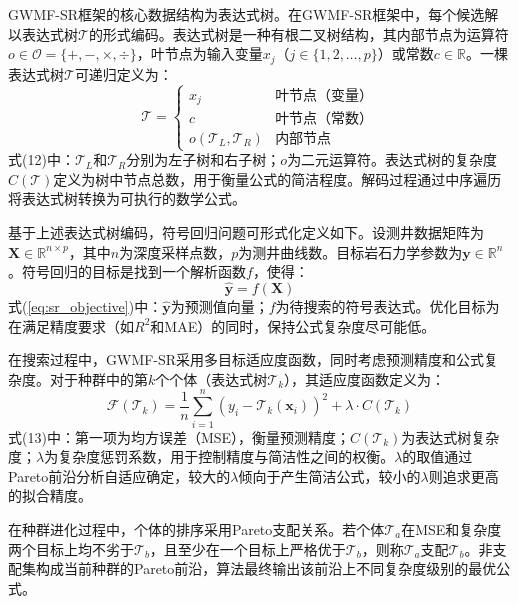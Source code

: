 \documentclass[a4paper,12pt]{ctexart}
\begin{document}
GWMF-SR框架的核心数据结构为表达式树。在GWMF-SR框架中，每个候选解以表达式树$\mathcal{T}$的形式编码。表达式树是一种有根二叉树结构，其内部节点为运算符$o \in \mathcal{O} = \{+, -, \times, \div\}$，叶节点为输入变量$x_j$（$j \in \{1, 2, \ldots, p\}$）或常数$c \in \mathbb{R}$。一棵表达式树$\mathcal{T}$可递归定义为：
\begin{equation}
\mathcal{T} = \begin{cases} x_j & \text{叶节点（变量）} \\ c & \text{叶节点（常数）} \\ o(\mathcal{T}_L, \mathcal{T}_R) & \text{内部节点} \end{cases} \tag{12}
\end{equation}
式(12)中：$\mathcal{T}_L$和$\mathcal{T}_R$分别为左子树和右子树；$o$为二元运算符。表达式树的复杂度$C(\mathcal{T})$定义为树中节点总数，用于衡量公式的简洁程度。解码过程通过中序遍历将表达式树转换为可执行的数学公式。

基于上述表达式树编码，符号回归问题可形式化定义如下。设测井数据矩阵为$\mathbf{X} \in \mathbb{R}^{n \times p}$，其中$n$为深度采样点数，$p$为测井曲线数。目标岩石力学参数为$\mathbf{y} \in \mathbb{R}^{n}$。符号回归的目标是找到一个解析函数$f$，使得：
\begin{equation}
  \hat{\mathbf{y}} = f(\mathbf{X}) \tag{1}
  \label{eq:sr_objective}
\end{equation}
式(\ref{eq:sr_objective})中：$\hat{\mathbf{y}}$为预测值向量；$f$为待搜索的符号表达式。优化目标为在满足精度要求（如$R^2$和MAE）的同时，保持公式复杂度尽可能低。

在搜索过程中，GWMF-SR采用多目标适应度函数，同时考虑预测精度和公式复杂度。对于种群中的第$k$个个体（表达式树$\mathcal{T}_k$），其适应度函数定义为：
\begin{equation}
\mathcal{F}(\mathcal{T}_k) = \frac{1}{n}\sum_{i=1}^{n}(y_i - \mathcal{T}_k(\mathbf{x}_i))^2 + \lambda \cdot C(\mathcal{T}_k) \tag{13}
\end{equation}
式(13)中：第一项为均方误差（MSE），衡量预测精度；$C(\mathcal{T}_k)$为表达式树复杂度；$\lambda$为复杂度惩罚系数，用于控制精度与简洁性之间的权衡。$\lambda$的取值通过Pareto前沿分析自适应确定，较大的$\lambda$倾向于产生简洁公式，较小的$\lambda$则追求更高的拟合精度。

在种群进化过程中，个体的排序采用Pareto支配关系。若个体$\mathcal{T}_a$在MSE和复杂度两个目标上均不劣于$\mathcal{T}_b$，且至少在一个目标上严格优于$\mathcal{T}_b$，则称$\mathcal{T}_a$支配$\mathcal{T}_b$。非支配集构成当前种群的Pareto前沿，算法最终输出该前沿上不同复杂度级别的最优公式。
\end{document}
